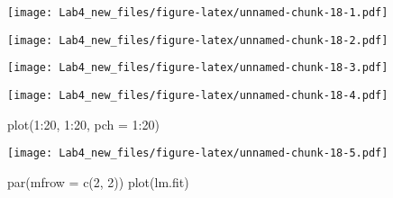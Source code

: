 \documentclass[
]{article}
\newenvironment{Shaded}{\begin{snugshade}}{\end{snugshade}}
\newcommand{\AttributeTok}[1]{\textcolor[rgb]{0.77,0.63,0.00}{#1}}
\newcommand{\DecValTok}[1]{\textcolor[rgb]{0.00,0.00,0.81}{#1}}
\newcommand{\FunctionTok}[1]{\textcolor[rgb]{0.00,0.00,0.00}{#1}}
\newcommand{\NormalTok}[1]{#1}
\newcommand{\SpecialCharTok}[1]{\textcolor[rgb]{0.00,0.00,0.00}{#1}}
\newcommand{\StringTok}[1]{\textcolor[rgb]{0.31,0.60,0.02}{#1}}
\begin{document}
\texttt{[image: Lab4\_new\_files/figure-latex/unnamed-chunk-18-1.pdf]}

\begin{Shaded}
\end{Shaded}

\texttt{[image: Lab4\_new\_files/figure-latex/unnamed-chunk-18-2.pdf]}

\begin{Shaded}
\end{Shaded}

\texttt{[image: Lab4\_new\_files/figure-latex/unnamed-chunk-18-3.pdf]}

\begin{Shaded}
\end{Shaded}

\texttt{[image: Lab4\_new\_files/figure-latex/unnamed-chunk-18-4.pdf]}

\begin{Shaded}
\begin{Highlighting}[]
\FunctionTok{plot}\NormalTok{(}\DecValTok{1}\SpecialCharTok{:}\DecValTok{20}\NormalTok{, }\DecValTok{1}\SpecialCharTok{:}\DecValTok{20}\NormalTok{, }\AttributeTok{pch =} \DecValTok{1}\SpecialCharTok{:}\DecValTok{20}\NormalTok{)}
\end{Highlighting}
\end{Shaded}

\texttt{[image: Lab4\_new\_files/figure-latex/unnamed-chunk-18-5.pdf]}

\begin{Shaded}
\begin{Highlighting}[]
\FunctionTok{par}\NormalTok{(}\AttributeTok{mfrow =} \FunctionTok{c}\NormalTok{(}\DecValTok{2}\NormalTok{, }\DecValTok{2}\NormalTok{))}
\FunctionTok{plot}\NormalTok{(lm.fit)}
\end{Highlighting}
\end{Shaded}
\end{document}

